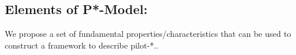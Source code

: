 \documentclass[conference,final]{IEEEtran}
\newcommand{\jhanote}[1]{ {\textcolor{red} { ***shantenu: #1 }}}
\newcommand{\jhanote}[1]{}
\begin{document}
% 
% 


\subsection{Elements of P*-Model:}
\label{sec:p_star_elements}
We propose a set of fundamental properties/characteristics that can be
used to construct a framework to describe pilot-*..

\end{document}
